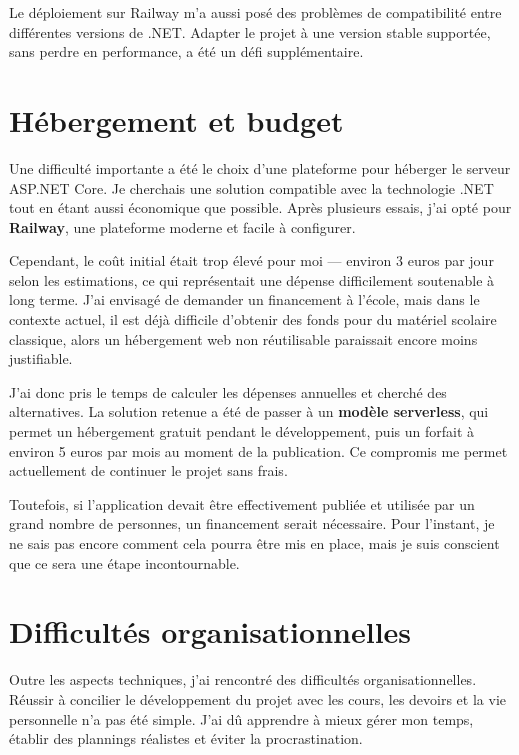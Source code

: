 \documentclass[12pt]{report}
\begin{document}
Le déploiement sur Railway m’a aussi posé des problèmes de compatibilité entre différentes versions de .NET. Adapter le projet à une version stable supportée, sans perdre en performance, a été un défi supplémentaire.

\section{Hébergement et budget}

Une difficulté importante a été le choix d’une plateforme pour héberger le serveur ASP.NET Core. Je cherchais une solution compatible avec la technologie .NET tout en étant aussi économique que possible. Après plusieurs essais, j’ai opté pour \textbf{Railway}, une plateforme moderne et facile à configurer.

Cependant, le coût initial était trop élevé pour moi — environ 3 euros par jour selon les estimations, ce qui représentait une dépense difficilement soutenable à long terme. J’ai envisagé de demander un financement à l’école, mais dans le contexte actuel, il est déjà difficile d’obtenir des fonds pour du matériel scolaire classique, alors un hébergement web non réutilisable paraissait encore moins justifiable.

J’ai donc pris le temps de calculer les dépenses annuelles et cherché des alternatives. La solution retenue a été de passer à un \textbf{modèle serverless}, qui permet un hébergement gratuit pendant le développement, puis un forfait à environ 5 euros par mois au moment de la publication. Ce compromis me permet actuellement de continuer le projet sans frais.

Toutefois, si l’application devait être effectivement publiée et utilisée par un grand nombre de personnes, un financement serait nécessaire. Pour l’instant, je ne sais pas encore comment cela pourra être mis en place, mais je suis conscient que ce sera une étape incontournable.

\section{Difficultés organisationnelles}

Outre les aspects techniques, j’ai rencontré des difficultés organisationnelles. Réussir à concilier le développement du projet avec les cours, les devoirs et la vie personnelle n’a pas été simple. J’ai dû apprendre à mieux gérer mon temps, établir des plannings réalistes et éviter la procrastination.
\end{document}
